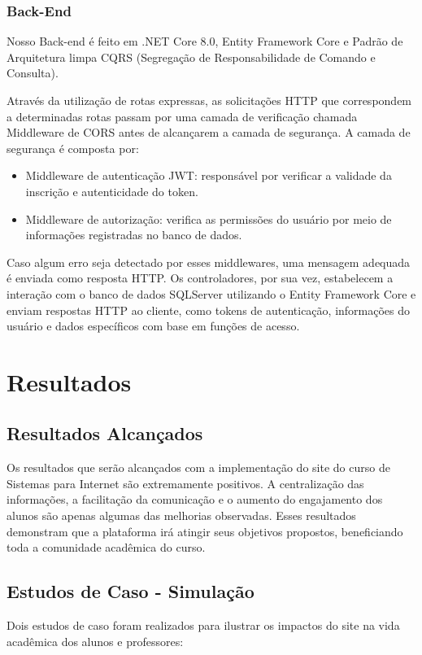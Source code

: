 \documentclass[a4paper,12pt]{report}
\begin{document}
\subsection{Back-End} 
Nosso Back-end é feito em .NET Core 8.0, Entity Framework Core e Padrão de Arquitetura limpa CQRS (Segregação de Responsabilidade de Comando e Consulta).
  
Através da utilização de rotas expressas, as solicitações HTTP que correspondem a determinadas rotas passam por uma camada de verificação chamada Middleware de CORS antes de alcançarem a camada de segurança. 
A camada de segurança é composta por: 
\begin{itemize} 
  \item Middleware de autenticação JWT: responsável por verificar a validade da inscrição e autenticidade do token. 
  \item Middleware de autorização: verifica as permissões do usuário por meio de informações registradas no banco de dados. 
\end{itemize} 
Caso algum erro seja detectado por esses middlewares, uma mensagem adequada é enviada como resposta HTTP. 
Os controladores, por sua vez, estabelecem a interação com o banco de dados SQLServer utilizando o Entity Framework Core e enviam respostas HTTP ao cliente, como tokens de autenticação, informações do usuário e dados específicos com base em funções de acesso. 

\chapter{Resultados}
\section{Resultados Alcançados}
Os resultados que serão alcançados com a implementação do site do curso de Sistemas para Internet são extremamente positivos. A centralização das informações, a facilitação da comunicação e o aumento do engajamento dos alunos são apenas algumas das melhorias observadas. Esses resultados demonstram que a plataforma irá atingir seus objetivos propostos, beneficiando toda a comunidade acadêmica do curso.

\section{Estudos de Caso - Simulação}
Dois estudos de caso foram realizados para ilustrar os impactos do site na vida acadêmica dos alunos e professores:
\end{document}
